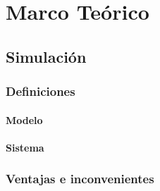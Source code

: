 \chapter{Marco Teórico}

\section{Simulación}\label{sec:simulacion}




\subsection{Definiciones}

\subsubsection{Modelo}





\subsubsection{Sistema}

\subsection{Ventajas e inconvenientes}

